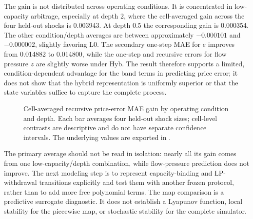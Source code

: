 The gain is not distributed across operating conditions. It is concentrated in low-capacity arbitrage, especially at depth 2, where the cell-averaged gain across the four held-out shocks is 0.003943. At depth 0.5 the corresponding gain is 0.000354. The other condition/depth averages are between approximately $-0.000101$ and $-0.000002$, slightly favoring L0. The secondary one-step MAE for $e$ improves from 0.014882 to 0.014800, while the one-step and recursive errors for flow pressure $z$ are slightly worse under Hyb. The result therefore supports a limited, condition-dependent advantage for the band terms in predicting price error; it does not show that the hybrid representation is uniformly superior or that the state variables suffice to capture the complete process.

\begin{figure}[H]
\centering
{}
\caption{Cell-averaged recursive price-error MAE gain by operating condition and depth. Each bar averages four held-out shock sizes; cell-level contrasts are descriptive and do not have separate confidence intervals. The underlying values are exported in .}
\label{fig:hybrid-cell-gains}
\end{figure}

The primary average should not be read in isolation: nearly all its gain comes from one low-capacity/depth combination, while flow-pressure prediction does not improve. The next modeling step is to represent capacity-binding and LP-withdrawal transitions explicitly and test them with another frozen protocol, rather than to add more free polynomial terms. The map comparison is a predictive surrogate diagnostic. It does not establish a Lyapunov function, local stability for the piecewise map, or stochastic stability for the complete simulator.


